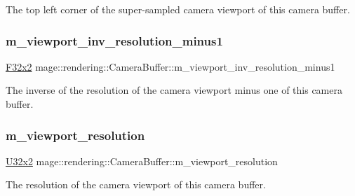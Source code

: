 The top left corner of the super-\/sampled camera viewport of this camera buffer. \hypertarget{structmage_1_1rendering_1_1_camera_buffer_a87dae6d19b7c84d361ff5304cc0fd637}{}\label{structmage_1_1rendering_1_1_camera_buffer_a87dae6d19b7c84d361ff5304cc0fd637} 
\subsubsection{\texorpdfstring{m\+\_\+viewport\+\_\+inv\+\_\+resolution\+\_\+minus1}{m\_viewport\_inv\_resolution\_minus1}}
{\footnotesize\ttfamily \hyperlink{namespacemage_aa87237ad091f5cd7da612b8523fc108f}{F32x2} mage\+::rendering\+::\+Camera\+Buffer\+::m\+\_\+viewport\+\_\+inv\+\_\+resolution\+\_\+minus1}

The inverse of the resolution of the camera viewport minus one of this camera buffer. \hypertarget{structmage_1_1rendering_1_1_camera_buffer_a433bdb3d8b4e86fcd04fdb2b794bd0f7}{}\label{structmage_1_1rendering_1_1_camera_buffer_a433bdb3d8b4e86fcd04fdb2b794bd0f7} 
\subsubsection{\texorpdfstring{m\+\_\+viewport\+\_\+resolution}{m\_viewport\_resolution}}
{\footnotesize\ttfamily \hyperlink{namespacemage_a88e05bff0300120c013285d3dcad95c5}{U32x2} mage\+::rendering\+::\+Camera\+Buffer\+::m\+\_\+viewport\+\_\+resolution}

The resolution of the camera viewport of this camera buffer. \hypertarget{structmage_1_1rendering_1_1_camera_buffer_a7184e2c6407bbf0702631b932f673d07}{}\label{structmage_1_1rendering_1_1_camera_buffer_a7184e2c6407bbf0702631b932f673d07} 
